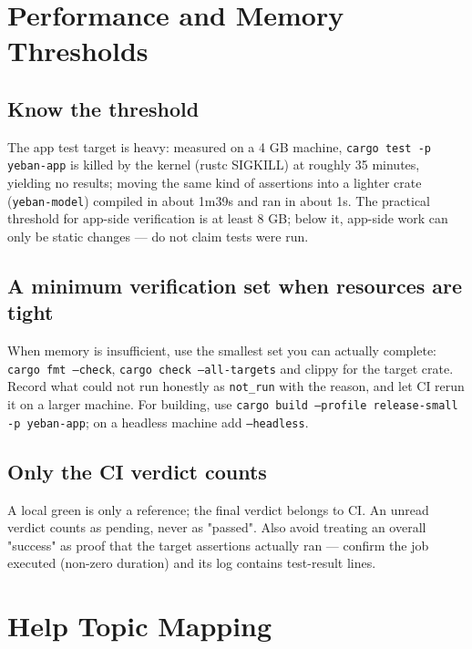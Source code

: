 \section{Performance and Memory Thresholds}

\subsection{Know the threshold}

The app test target is heavy: measured on a 4 GB machine, \texttt{cargo test -p yeban-app}
is killed by the kernel (rustc SIGKILL) at roughly 35 minutes, yielding no results; moving
the same kind of assertions into a lighter crate (\texttt{yeban-model}) compiled in about
1m39s and ran in about 1s. The practical threshold for app-side verification is at least
8 GB; below it, app-side work can only be static changes — do not claim tests were run.

\subsection{A minimum verification set when resources are tight}

When memory is insufficient, use the smallest set you can actually complete:
\texttt{cargo fmt --check}, \texttt{cargo check --all-targets} and clippy for the target
crate. Record what could not run honestly as \texttt{not\_run} with the reason, and let CI
rerun it on a larger machine. For building, use
\texttt{cargo build --profile release-small -p yeban-app}; on a headless machine add
\texttt{--headless}.

\subsection{Only the CI verdict counts}

A local green is only a reference; the final verdict belongs to CI. An unread verdict
counts as pending, never as "passed". Also avoid treating an overall "success" as proof
that the target assertions actually ran — confirm the job executed (non-zero duration)
and its log contains test-result lines.

\section{Help Topic Mapping}

